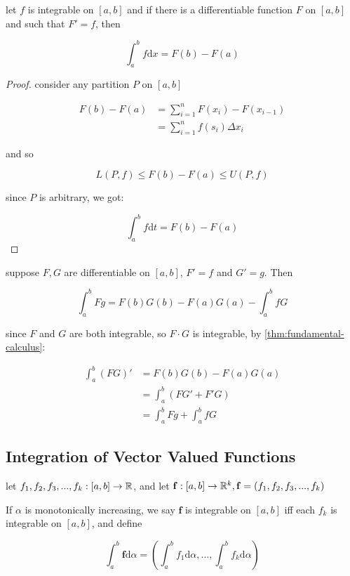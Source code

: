 \begin{thm}
    \label{thm:fundamental-calculus}
    let $f$ is integrable on $[a,b]$ and if there is a differentiable function $F$ on $[a,b]$
    and such that $F' = f$, then

    \[
        \int_a^b f \mathrm{d}x = F(b) - F(a)
    \]
\end{thm}

\begin{proof}
    consider any partition $P$ on $[a,b]$ 

    \begin{align*}
        F(b) - F(a) &= \sum_{i=1}^{n} F(x_i) - F(x_{i-1}) \\
        & = \sum_{i=1}^{n} f(s_i) \Delta x_i
    \end{align*}

    and so

    \[
        L(P,f) \le F(b) - F(a) \le U(P,f)
    \]

    since $P$ is arbitrary, we got:

    \[
        \int_a^b f \mathrm{d}t = F(b) - F(a)
    \]
\end{proof}

\begin{thm}
    suppose $F,G$ are differentiable on $[a,b]$, $F' = f$ and $G' = g$. Then 

    \[
        \int_a^b Fg = F(b)G(b) - F(a)G(a) - \int_a^b f G 
    \]

    since $F$ and $G$ are both integrable, so $F\cdot G$ is integrable, by \autoref{thm:fundamental-calculus}:

    \begin{align*}
        \int_a^b (FG)' &= F(b)G(b) - F(a)G(a) \\
        &= \int_a^b \left( FG' + F'G\right) \\
        &= \int_a^b Fg + \int_a^b fG
    \end{align*}
\end{thm}

\subsection{Integration of Vector Valued Functions}

\begin{definition}
    let $f_1, f_2,f_3, ..., f_k : [a,b] \to \mathbb{R}$, and let $\mathbf{f}: [a,b] \to \mathbb{R}^k, \mathbf{f} = (f_1,f_2,f_3,...,f_k)$ 

    If $\alpha$ is monotonically increasing, we say $\mathbf{f}$ is integrable on $[a,b]$ iff each $f_k$ is integrable on $[a,b]$, and define

    \[
        \int_a^b \mathbf{f} \mathrm{d} \alpha = (\int_a^b f_1 \mathrm{d} \alpha, ..., \int_a^b f_k \mathrm{d} \alpha)
    \]
\end{definition}


